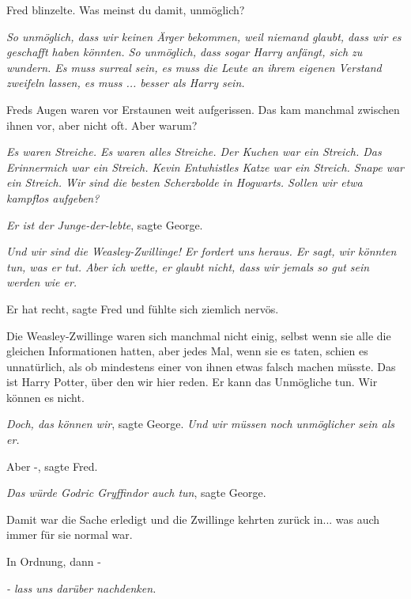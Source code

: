 Fred blinzelte. \glqq{}Was meinst du damit, unmöglich?\grqq{}

\glqq{}\emph{So unmöglich, dass wir keinen Ärger bekommen, weil niemand glaubt,
dass wir es geschafft haben könnten. So unmöglich, dass sogar Harry anfängt,
sich zu wundern. Es muss surreal sein, es muss die Leute an ihrem eigenen
Verstand zweifeln lassen, es muss ... \emph{besser als} Harry sein.}\grqq{}

Freds Augen waren vor Erstaunen weit aufgerissen. Das kam manchmal zwischen
ihnen vor, aber nicht oft. \glqq{}Aber warum?\grqq{}

\glqq{}\emph{Es waren Streiche. Es waren alles Streiche. Der Kuchen war ein
Streich. Das Erinnermich war ein Streich. Kevin Entwhistles Katze war ein
Streich. Snape war ein Streich. Wir sind die besten Scherzbolde in Hogwarts.
Sollen wir etwa kampflos aufgeben?}\grqq{}

\glqq{}\emph{Er ist der Junge-der-lebte}\grqq{}, sagte George.

\glqq{}\emph{Und wir sind die Weasley-Zwillinge! Er fordert uns heraus. Er sagt,
wir könnten tun, was er tut. Aber ich wette, er glaubt nicht, dass wir jemals so
gut sein werden wie er.}\grqq{}

\glqq{}Er hat recht\grqq{}, sagte Fred und fühlte sich ziemlich nervös.

Die Weasley-Zwillinge waren sich manchmal nicht einig, selbst wenn sie alle die
gleichen Informationen hatten, aber jedes Mal, wenn sie es taten, schien es
unnatürlich, als ob mindestens einer von ihnen etwas falsch machen müsste.
\glqq{}Das ist Harry Potter, über den wir hier reden. Er kann das Unmögliche
tun. Wir können es nicht.\grqq{}

\glqq{}\emph{Doch, das können wir}\grqq{}, sagte George. \glqq{}\emph{Und wir
müssen noch unmöglicher sein als er.}\grqq{}

\glqq{}Aber -\grqq{}, sagte Fred.

\glqq{}\emph{Das würde Godric Gryffindor auch tun}\grqq{}, sagte George.

Damit war die Sache erledigt und die Zwillinge kehrten zurück in... was auch
immer für sie normal war.

\glqq{}In Ordnung, dann -\grqq{}

\glqq{}\emph{- lass uns darüber nachdenken.}\grqq{}
